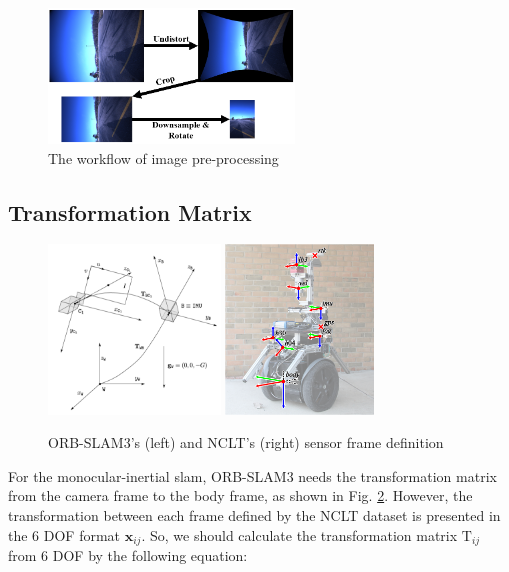 \documentclass[letterpaper, 10 pt, conference]{ieeeconf}  %
\begin{document}
\begin{figure}[ht]
\centering
\includegraphics[height=3.6cm]{image_preprocess.png}
\caption{The workflow of image pre-processing}
\label{fig_image_preprocess}
\end{figure}


\subsection{Transformation Matrix}

\begin{figure}[ht]
\centering
\includegraphics[height=4.5cm]{frame_orbslam.png}
\includegraphics[height=4.5cm]{frame_nclt.png}
\caption{ORB-SLAM3's (left) and NCLT's (right) sensor frame definition \cite{orbslam3}\cite{NCLT}}
\label{fig_frame}
\end{figure}


For the monocular-inertial slam, ORB-SLAM3 needs the transformation matrix from the camera frame to the body frame, as shown in Fig. \ref{fig_frame}. However, the transformation between each frame defined by the NCLT dataset is presented in the 6 DOF format $\mathbf{x}_{i j}$. So, we should calculate the transformation matrix $\mathrm{T}_{ij}$ from 6 DOF by the following equation:
\end{document}
